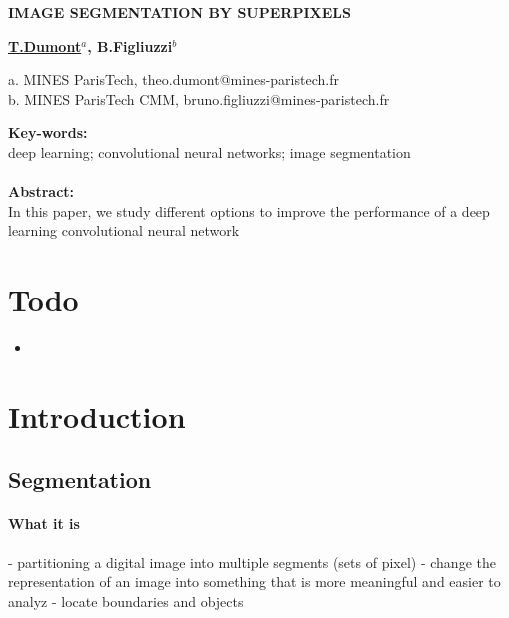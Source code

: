 \documentclass{article}
\begin{document}
\newcommand{\spp}{superpixel}

\begin{center}
    \begin{Large}\textbf{IMAGE SEGMENTATION BY SUPERPIXELS}\end{Large}

    \vspace{1cm}
    \begin{large}\textbf{\underline{T.Dumont$^a$}, B.Figliuzzi$^b$}\end{large}

    \vspace{0.5cm}
    a. MINES ParisTech, theo.dumont@mines-paristech.fr\\
    b. MINES ParisTech CMM, bruno.figliuzzi@mines-paristech.fr
    \vspace{1cm}
\end{center}

\begin{center}
\noindent\textbf{Key-words: }\\
deep learning; convolutional neural networks; image segmentation\\
\ \\
\textbf{Abstract: }\\
In this paper, we study different options to improve the performance of a deep learning convolutional neural network
\end{center}

\tableofcontents

\section*{Todo}
\begin{itemize}
    \item
\end{itemize}

\newpage
\section{Introduction}

    \subsection{Segmentation}
            \paragraph{What it is}
            - partitioning a digital image into multiple segments (sets of pixel)
            - change the representation of an image into something that is more meaningful and easier to analyz
            - locate boundaries and objects
\end{document}
